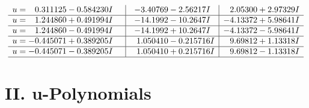 \documentclass[1p]{elsarticle_modified}
\theoremstyle{definition}
\begin{document}
$$\begin{array}{c|c|c}
\begin{aligned}
u &= \phantom{-}0.311125 - 0.584230 I\end{aligned}
 & -3.40769 - 2.56217 I & \phantom{-}2.05300 + 2.97329 I \\ \hline\begin{aligned}
u &= \phantom{-}1.244860 + 0.491994 I\end{aligned}
 & -14.1992 - 10.2647 I & -4.13372 + 5.98641 I \\ \hline\begin{aligned}
u &= \phantom{-}1.244860 - 0.491994 I\end{aligned}
 & -14.1992 + 10.2647 I & -4.13372 - 5.98641 I \\ \hline\begin{aligned}
u &= -0.445071 + 0.389205 I\end{aligned}
 & \phantom{-}1.050410 - 0.215716 I & \phantom{-}9.69812 + 1.13318 I \\ \hline\begin{aligned}
u &= -0.445071 - 0.389205 I\end{aligned}
 & \phantom{-}1.050410 + 0.215716 I & \phantom{-}9.69812 - 1.13318 I\\
 \hline 
 \end{array}$$\newpage
\newpage\renewcommand{\arraystretch}{1}
\centering \section*{ II. u-Polynomials}
\end{document}

